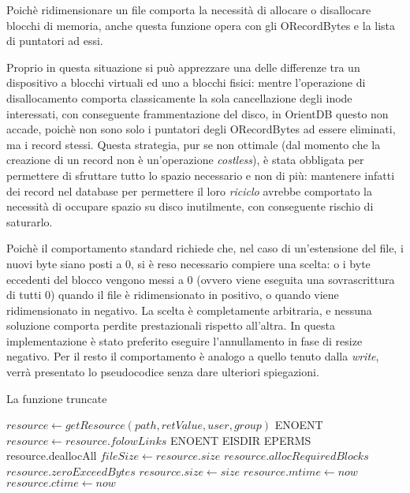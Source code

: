 Poichè ridimensionare un file comporta la necessità di allocare o disallocare blocchi di memoria, anche questa funzione opera con gli ORecordBytes e la lista di puntatori ad essi.

Proprio in questa situazione si può apprezzare una delle differenze tra un dispositivo a blocchi virtuali ed uno a blocchi fisici: mentre l'operazione di disallocamento comporta classicamente la sola cancellazione degli inode interessati, con conseguente frammentazione del disco, in OrientDB questo non accade, poichè non sono solo i puntatori degli ORecordBytes ad essere eliminati, ma i record stessi. Questa strategia, pur se non ottimale (dal momento che la creazione di un record non è un'operazione \emph{costless}), è stata obbligata per permettere di sfruttare tutto lo spazio necessario e non di più: mantenere infatti dei record nel database per permettere il loro \emph{riciclo} avrebbe comportato la necessità di occupare spazio su disco inutilmente, con conseguente rischio di saturarlo.

Poichè il comportamento standard richiede che, nel caso di un'estensione del file, i nuovi byte siano posti a 0, si è reso necessario compiere una scelta: o i byte eccedenti del blocco vengono messi a 0 (ovvero viene eseguita una sovrascrittura di tutti 0) quando il file è ridimensionato in positivo, o quando viene ridimensionato in negativo. La scelta è completamente arbitraria, e nessuna soluzione comporta perdite prestazionali rispetto all'altra. In questa implementazione è stato preferito eseguire l'annullamento in fase di resize negativo. Per il resto il comportamento è analogo a quello tenuto dalla \emph{write}, verrà presentato lo pseudocodice senza dare ulteriori spiegazioni.

\begin{algorithm}
\begin{algorithmic}[5]
\caption{La funzione truncate}
	\State $resource \gets getResource(path, retValue, user, group)$
		\State \Return ENOENT
	\EndIf
		\State $resource \gets resource.folowLinks$
	\EndIf
		\State \Return ENOENT
		\State \Return EISDIR
	\EndIf
		\State \Return EPERMS
	\EndIf
		\State resource.deallocAll
		\State {}
	\EndIf	
	\State $fileSize \gets resource.size$
		\State {}
	\EndIf
	\State $resource.allocRequiredBlocks$	
		\State $resource.zeroExceedBytes$
	\EndIf
	\State $resource.size \gets size$
	\State $resource.mtime \gets now$
	\State $resource.ctime \gets now$
	\State {}
\EndFunction
\end{algorithmic}
\end{algorithm}

